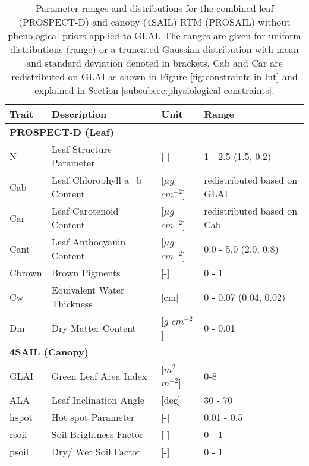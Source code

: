 \begin{table}[H]
\caption{Parameter ranges and distributions for the combined leaf (PROSPECT-D) and canopy (4SAIL) RTM (PROSAIL) without phenological priors applied to GLAI. The ranges are given for uniform distributions (range) or a truncated Gaussian distribution with mean and standard deviation denoted in brackets. Cab and Car are redistributed on GLAI as shown in Figure \ref{fig:constraints-in-lut} and explained in Section \ref{subsubsec:physiological-constraints}.}
\label{tab:prosail-inputs}
\begin{tabular}{@{}lllllll@{}}
\toprule
  \textbf{Trait}     & \textbf{Description}         & \textbf{Unit}           & \multicolumn{4}{l}{\textbf{Range}}              \\ \midrule
\multicolumn{7}{l}{\textbf{PROSPECT-D (Leaf)}}                                                                \\
\midrule
N      & Leaf Structure Parameter     & {[}-{]}                 & \multicolumn{4}{l}{1 - 2.5 (1.5, 0.2)}          \\
Cab    & Leaf Chlorophyll a+b Content & {[}$\mu g$ $cm^{-2}${]} & \multicolumn{4}{l}{redistributed based on GLAI} \\
Car    & Leaf Carotenoid Content      & {[}$\mu g$ $cm^{-2}${]} & \multicolumn{4}{l}{redistributed based on Cab}  \\
Cant   & Leaf Anthocyanin Content     & {[}$\mu g$ $cm^{-2}${]} & \multicolumn{4}{l}{0.0 - 5.0 (2.0, 0.8)}        \\
Cbrown & Brown Pigments               & {[}-{]}                 & \multicolumn{4}{l}{0 - 1}                       \\
Cw     & Equivalent Water Thickness   & {[}cm{]}                & \multicolumn{4}{l}{0 - 0.07 (0.04, 0.02)}       \\
Dm     & Dry Matter Content           & {[}$g$ $cm^{-2}${]}     & \multicolumn{4}{l}{0 - 0.01}                    \\
\midrule
\multicolumn{7}{l}{\textbf{4SAIL (Canopy)}}                                                                     \\
\midrule
GLAI   & Green Leaf Area Index        & {[}$m^2$ $m^{-2}${]}    & \multicolumn{4}{l}{0-8}                         \\
ALA    & Leaf Inclination Angle       & {[}deg{]}               & \multicolumn{4}{l}{30 - 70}                     \\
hspot  & Hot spot Parameter           & {[}-{]}                 & \multicolumn{4}{l}{0.01 - 0.5}                  \\
rsoil  & Soil Brightness Factor       & {[}-{]}                 & \multicolumn{4}{l}{0 - 1}                       \\
psoil  & Dry/ Wet Soil Factor         & {[}-{]}                 & \multicolumn{4}{l}{0 - 1}                       \\ \bottomrule
\end{tabular}
\end{table}

